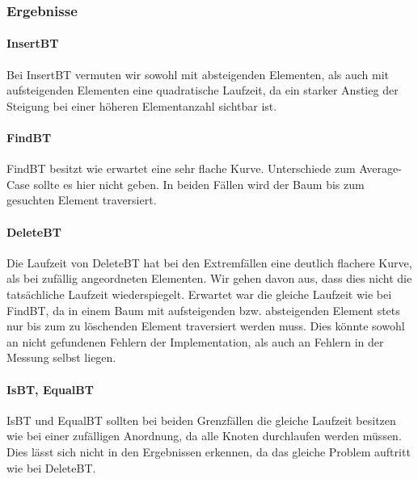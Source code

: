 \documentclass[11pt]{article}
\begin{document}
    \subsubsection{Ergebnisse}
    \paragraph{InsertBT}
        
    Bei InsertBT vermuten wir sowohl mit absteigenden Elementen, als auch mit aufsteigenden Elementen eine quadratische Laufzeit, da ein starker Anstieg der Steigung bei einer höheren Elementanzahl sichtbar ist.

    \paragraph{FindBT}
        
    FindBT besitzt wie erwartet eine sehr flache Kurve.
    Unterschiede zum Average-Case sollte es hier nicht geben. 
    In beiden Fällen wird der Baum bis zum gesuchten Element traversiert.

    \paragraph{DeleteBT}  
    
    Die Laufzeit von DeleteBT hat bei den Extremfällen eine deutlich flachere Kurve, als bei zufällig angeordneten Elementen. Wir gehen davon aus, dass dies nicht die tatsächliche Laufzeit wiederspiegelt. 
    Erwartet war die gleiche Laufzeit wie bei FindBT, da in einem Baum mit aufsteigenden bzw. absteigenden Element stets nur bis zum zu löschenden Element traversiert werden muss.
    Dies könnte sowohl an nicht gefundenen Fehlern der Implementation, als auch an Fehlern in der Messung selbst liegen.


        
    \paragraph{IsBT, EqualBT}  
    
    IsBT und EqualBT sollten bei beiden Grenzfällen die gleiche Laufzeit besitzen wie bei einer zufälligen Anordnung, da alle Knoten durchlaufen werden müssen. Dies lässt sich nicht in den Ergebnissen erkennen, da das gleiche Problem auftritt wie bei DeleteBT.
\end{document}
